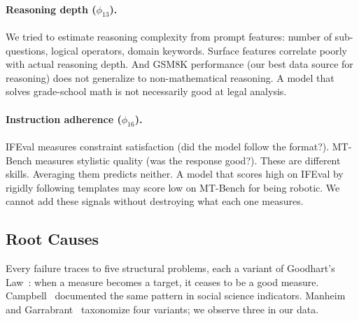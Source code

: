 \paragraph{Reasoning depth ($\phi_{13}$).} We tried to estimate reasoning complexity from prompt features: number of sub-questions, logical operators, domain keywords. Surface features correlate poorly with actual reasoning depth. And GSM8K performance (our best data source for reasoning) does not generalize to non-mathematical reasoning. A model that solves grade-school math is not necessarily good at legal analysis.

\paragraph{Instruction adherence ($\phi_{16}$).} IFEval measures constraint satisfaction (did the model follow the format?). MT-Bench measures stylistic quality (was the response good?). These are different skills. Averaging them predicts neither. A model that scores high on IFEval by rigidly following templates may score low on MT-Bench for being robotic. We cannot add these signals without destroying what each one measures.

\subsection{Root Causes}

Every failure traces to five structural problems, each a variant of Goodhart's Law~\citep{goodhart1975monetary}: when a measure becomes a target, it ceases to be a good measure. Campbell~\citep{campbell1979assessing} documented the same pattern in social science indicators. Manheim and Garrabrant~\citep{manheim2019categorizing} taxonomize four variants; we observe three in our data.

